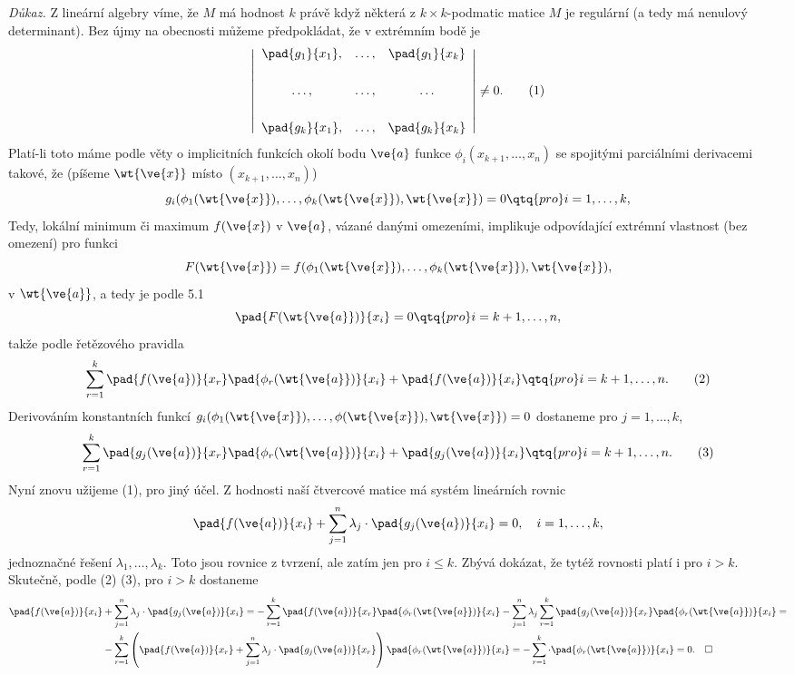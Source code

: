 \documentclass[12pt]{article}
\begin{document}
{{\em Důkaz.} Z lineární algebry víme, že  $M$ má hodnost $k$ právě když některá z $k\times k$-podmatic 
matice $M$ je regulární (a tedy má nenulový determinant). 
Bez újmy na obecnosti můžeme předpokládat, že v extrémním bodě je
 \begin{equation}
\left| \begin{array}{ccc}
 \displaystyle\pad{g_1}{x_1},&\dots,&\displaystyle\pad{g_1}{x_k}\\[4ex]
 \dots,&\dots,&\dots\\[4ex]
 \displaystyle\pad{g_k}{x_1},&\dots,&\displaystyle\pad{g_k}{x_k}
 \end{array}\right|\neq 0. \tag{1}
 \end{equation}
 Platí-li toto máme podle věty o implicitních funkcích okolí bodu 
$\ve{a}$ funkce $\phi_i(x_{k+1},\dots,x_n)$  se spojitými parciálními derivacemi takové, že (píšeme $\wt{\ve{x}}$ 
místo $(x_{k+1},\dots,x_n)$)
 $$
 g_i(\phi_1(\wt{\ve{x}}),\dots,\phi_k(\wt{\ve{x}}),\wt{\ve{x}})=0\qtq{pro} i=1,\dots,k,
 $$
 Tedy, lokální minimum či maximum 
 $f(\ve{x})$ v $\ve{a}$, vázané danými omezeními, implikuje 
odpovídající extrémní vlastnost (bez omezení) pro funkci
 $$
 F(\wt{\ve{x}})=f(\phi_1(\wt{\ve{x}}),\dots,\phi_k(\wt{\ve{x}}),\wt{\ve{x}}),
 $$
 v $\wt{\ve{a}}$, a tedy je podle 5.1
 $$
 \pad{F(\wt{\ve{a}})}{x_i}=0 \qtq{pro} i=k+1,\dots,n,
 $$
takže podle řetězového pravidla
 \begin{equation}
 \sum_{r=1}^k\pad{f(\ve{a})}{x_r}\pad{\phi_r(\wt{\ve{a}})}{x_i}+\pad{f(\ve{a})}{x_i}\qtq{pro} i=k+1,\dots,n. \tag{2}
\end{equation}
Derivováním konstantních funkcí $g_i(\phi_1(\wt{\ve{x}}),\dots,\phi(\wt{\ve{x}}),\wt{\ve{x}})=0$
dostaneme pro $j=1,\dots,k$,
\begin{equation}
 \sum_{r=1}^k\pad{g_j(\ve{a})}{x_r}\pad{\phi_r(\wt{\ve{a}})}{x_i}+\pad{g_j(\ve{a})}{x_i}\qtq{pro} i=k+1,\dots,n. \tag{3}
\end{equation}
Nyní znovu užijeme (1), pro jiný účel. Z hodnosti naší čtvercové matice má systém lineárních rovnic
$$
 \pad{f(\ve{a})}{x_i}+\sum_{j=1}^n\lambda_j\cdot\pad{g_j(\ve{a})}{x_i}=0, \quad i=1,\dots,k,
 $$ 
 jednoznačné řešení $\lambda_1,\dots,\lambda_k$. Toto jsou rovnice z tvrzení, ale zatím jen pro $i\leq k $. Zbývá dokázat, že tytéž rovnosti platí i pro
 $i>k$. Skutečně, podle (2)  (3), 
pro $i>k$ dostaneme
 $$
 \begin{aligned}
 \pad{f(\ve{a})}{x_i}&+\sum_{j=1}^n\lambda_j\cdot\pad{g_j(\ve{a})}{x_i}=
 -\sum_{r=1}^k\pad{f(\ve{a})}{x_r}\pad{\phi_r(\wt{\ve{a}})}{x_i}
 -\sum_{j=1}^n\lambda_j\sum_{r=1}^k\pad{g_j(\ve{a})}{x_r}\pad{\phi_r(\wt{\ve{a}})}{x_i}=\\
&-\sum_{r=1}^k\left(\pad{f(\ve{a})}{x_r}+\sum_{j=1}^n\lambda_j\cdot\pad{g_j(\ve{a})}{x_r}\right)\pad{\phi_r(\wt{\ve{a}})}{x_i}=-\sum_{r=1}^k\cdot\pad{\phi_r(\wt{\ve{a}})}{x_i}=0.\quad\square
 \end{aligned}
 $$

}
\end{document}
